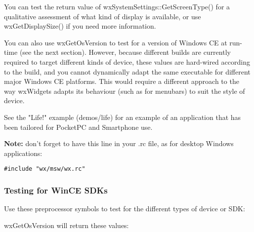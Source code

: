 You can test the return value of wxSystemSettings::GetScreenType()
for a qualitative assessment of what kind of display is available,
or use wxGetDisplaySize() if you need more information.

You can also use wxGetOsVersion to test for a version of Windows CE at
run-time (see the next section). However, because different builds
are currently required to target different kinds of device, these
values are hard-wired according to the build, and you cannot
dynamically adapt the same executable for different major Windows CE
platforms. This would require a different approach to the way
wxWidgets adapts its behaviour (such as for menubars) to suit the
style of device.

See the "Life!" example (demos/life) for an example of
an application that has been tailored for PocketPC and Smartphone use.

{\bf Note:} don't forget to have this line in your .rc file, as for
desktop Windows applications:

\begin{verbatim}
#include "wx/msw/wx.rc"
\end{verbatim}

\subsubsection{Testing for WinCE SDKs}

Use these preprocessor symbols to test for the different types of device or SDK:

\begin{twocollist}\itemsep=0pt
\end{twocollist}

wxGetOsVersion will return these values:

\begin{twocollist}\itemsep=0pt
\end{twocollist}

